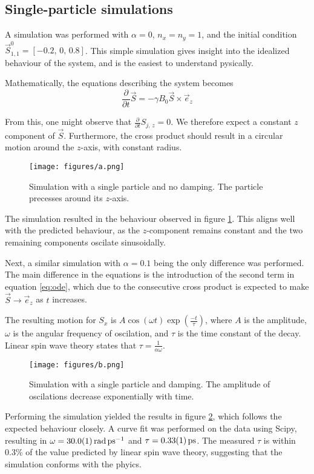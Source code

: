 
\subsection*{Single-particle simulations}
A simulation was performed with $\alpha = 0$, $n_x = n_y = 1$, and the initial condition 
$\vec{S}_{1,1}^0 = \left[-0.2,\, 0,\, 0.8\right]$. 
This simple simulation gives insight into the idealized behaviour of the system, 
and is the easiest to understand pysically.

Mathematically, the equations describing the system becomes
\begin{equation*}
    \frac{\partial}{\partial t} \vec{S} = -\gamma B_0\vec{S}\times\vec{e}_z
\end{equation*}

From this, one might observe that $\frac{\partial}{\partial t}S_{j,\,z} = 0$. 
We therefore expect a constant $z$ component of $\vec{S}$.
Furthermore, the cross product should result in a circular motion around the $z$-axis, 
with constant radius.

\begin{figure}
    \centering
    \texttt{[image: figures/a.png]}
    \caption{Simulation with a single particle and no damping. 
    The particle precesses around its $z$-axis.}
    \label{fig:a}
\end{figure}

The simulation resulted in the behaviour observed in figure \ref{fig:a}. 
This aligns well with the predicted behaviour, as the $z$-component remains constant and
the two remaining components oscilate sinusoidally.

Next, a similar simulation with $\alpha = 0.1$ being the only difference was performed. 
The main difference in the equations is the introduction of the second term in equation \ref{eq:ode}, 
which due to the consecutive cross product is expected to make 
$\vec{S} \rightarrow \vec{e}_z$ as $t$ increases. 

The resulting motion for $S_x$ is $A\cos(\omega t)\exp(\frac{-t}{\tau})$, 
where $A$ is the amplitude, $\omega$ is the angular frequency of oscilation, 
and $\tau$ is the time constant of the decay. 
Linear spin wave theory states that $\tau = \frac{1}{\alpha\omega}$.

\begin{figure}
    \centering
    \texttt{[image: figures/b.png]}
    \caption{
        Simulation with a single particle and damping. 
        The amplitude of oscilations decrease exponentially with time.
    }
    \label{fig:b}
\end{figure}

Performing the simulation yielded the results in figure \ref{fig:b}, 
which follows the expected behaviour closely. A curve fit was performed on the data using Scipy, 
resulting in $\omega = \SI{30.0\pm0.1}{\radian\per\pico\second}$ and $\tau = \SI{0.33\pm0.01}{\pico\second}$.
The measured $\tau$ is within 0.3\% of the value predicted by linear spin wave theory, 
suggesting that the simulation conforms with the phyics.
